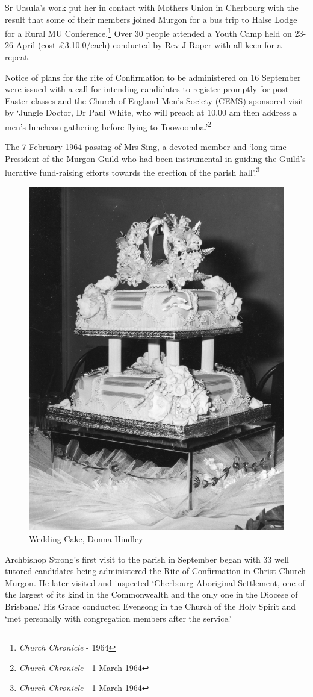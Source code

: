 Sr Ursula's work put her in contact with Mothers Union in Cherbourg with the result that some of their members joined Murgon for a bus trip to Halse Lodge for a Rural MU Conference.\footnote{\emph{Church Chronicle} - 1964} Over 30 people attended a Youth Camp held on 23-26 April (cost \pounds3.10.0/each) conducted by Rev J Roper with all keen for a repeat.


Notice of plans for the rite of Confirmation to be administered on 16 September were issued with a call for intending candidates to register promptly for post-Easter classes and the Church of England Men's Society (CEMS) sponsored visit by `Jungle Doctor, Dr Paul White, who will preach at 10.00 am then address a men's luncheon gathering before flying to Toowoomba.'\footnote{\emph{Church Chronicle} - 1 March 1964}


The 7 February 1964 passing of Mrs Sing, a devoted member and `long-time President of the Murgon Guild who had been instrumental in guiding the Guild's lucrative fund-raising efforts towards the erection of the parish hall'.\footnote{\emph{Church Chronicle} - 1 March 1964}








\begin{figure}
\begin{center}
\includegraphics[width=.5\linewidth,center]{../images/donnaWeddingCake.jpg}
\caption{Wedding Cake, Donna Hindley}
\end{center}
\end{figure}




Archbishop Strong's first visit to the parish in September began with 33 well tutored candidates being administered the Rite of Confirmation in Christ Church Murgon. He later visited and inspected `Cherbourg Aboriginal Settlement, one of the largest of its kind in the Commonwealth and the only one in the Diocese of Brisbane.' His Grace conducted Evensong in the Church of the Holy Spirit and `met personally with congregation members after the service.'




